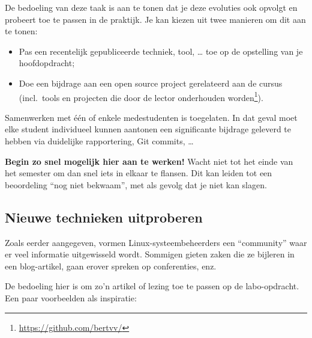 De bedoeling van deze taak is aan te tonen dat je deze evoluties ook opvolgt en probeert toe te passen in de praktijk. Je kan kiezen uit twee manieren om dit aan te tonen:

\begin{itemize}
  \item Pas een recentelijk gepubliceerde techniek, tool, \ldots{} toe op de opstelling van je hoofdopdracht;
  \item Doe een bijdrage aan een open source project gerelateerd aan de cursus (incl.\ tools en projecten die door de lector onderhouden worden\footnote{\url{https://github.com/bertvv/}}).
\end{itemize}

Samenwerken met één of enkele medestudenten is toegelaten. In dat geval moet elke student individueel kunnen aantonen een significante bijdrage geleverd te hebben via duidelijke rapportering, Git commits, \ldots

\textbf{Begin zo snel mogelijk hier aan te werken!} Wacht niet tot het einde van het semester om dan snel iets in elkaar te flansen. Dit kan leiden tot een beoordeling ``nog niet bekwaam'', met als gevolg dat je niet kan slagen.

\subsection{Nieuwe technieken uitproberen}%
\label{subs:nieuwe-technieken-uitproberen}

Zoals eerder aangegeven, vormen Linux-systeembeheerders een ``community'' waar er veel informatie uitgewisseld wordt. Sommigen gieten zaken die ze bijleren in een blog-artikel, gaan erover spreken op conferenties, enz.

De bedoeling hier is om zo'n artikel of lezing toe te passen op de labo-opdracht. Een paar voorbeelden als inspiratie:

